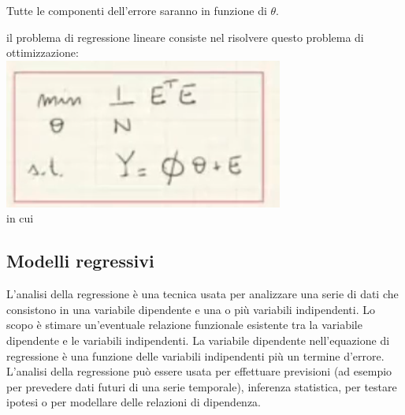 \documentclass[10pt,a4paper]{article}
\begin{document}
Tutte le componenti dell'errore saranno in funzione di $ \theta $.

il problema di regressione lineare consiste nel risolvere questo problema di ottimizzazione:\\
\includegraphics[scale=1]{err.png} \\
in cui 








\subsection{Modelli regressivi}

L'analisi della regressione è una tecnica usata per analizzare una serie di dati che consistono in una variabile dipendente e una o più variabili indipendenti. Lo scopo è stimare un'eventuale relazione funzionale esistente tra la variabile dipendente e le variabili indipendenti. La variabile dipendente nell'equazione di regressione è una funzione delle variabili indipendenti più un termine d'errore.
L'analisi della regressione può essere usata per effettuare previsioni (ad esempio per prevedere dati futuri di una serie temporale), inferenza statistica, per testare ipotesi o per modellare delle relazioni di dipendenza.
\end{document}
